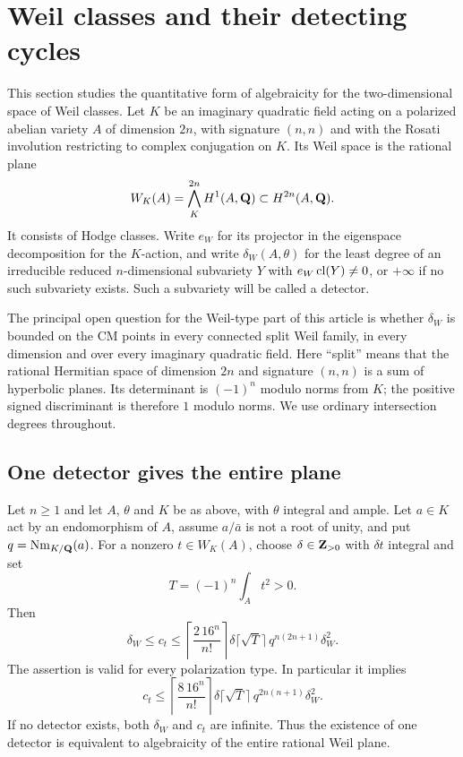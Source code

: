 \section{Weil classes and their detecting cycles}
\label{sec:weil}
This section studies the quantitative form of algebraicity for the two-dimensional space of Weil classes. Let $K$ be an imaginary quadratic field acting on a polarized abelian variety $A$ of dimension $2n$, with signature $(n,n)$ and with the Rosati involution restricting to complex conjugation on $K$. Its Weil space is the rational plane
\[
 W_K(A)=\bigwedge_K^{2n}H^1(A,\mathbf Q)\subset H^{2n}(A,\mathbf Q).
\]
It consists of Hodge classes. Write $e_W$ for its projector in the eigenspace decomposition for the $K$-action, and write $\delta_W(A,\theta)$ for the least degree of an irreducible reduced $n$-dimensional subvariety $Y$ with $e_W\operatorname{cl}(Y)\ne0$, or $+\infty$ if no such subvariety exists. Such a subvariety will be called a detector.

The principal open question for the Weil-type part of this article is whether $\delta_W$ is bounded on the CM points in every connected split Weil family, in every dimension and over every imaginary quadratic field. Here ``split'' means that the rational Hermitian space of dimension $2n$ and signature $(n,n)$ is a sum of hyperbolic planes. Its determinant is $(-1)^n$ modulo norms from $K$; the positive signed discriminant is therefore $1$ modulo norms. We use ordinary intersection degrees throughout.

\subsection{One detector gives the entire plane}

\begin{theorem}\label{thm:extraction}
Let $n\geq1$ and let $A$, $\theta$ and $K$ be as above, with $\theta$ integral and ample. Let $a\in K$ act by an endomorphism of $A$, assume $a/\bar a$ is not a root of unity, and put $q=\operatorname{Nm}_{K/\mathbf Q}(a)$. For a nonzero $t\in W_K(A)$, choose $\delta\in\mathbf Z_{>0}$ with $\delta t$ integral and set
\[
 T=(-1)^n\int_A t^2>0.
\]
Then
\begin{equation}\label{eq:sharper-extraction}
 \delta_W\leq c_t\leq
 \left\lceil\frac{2\,16^n}{n!}\right\rceil
 \delta\lceil\sqrt T\rceil\,
 q^{n(2n+1)}\delta_W^2.
\end{equation}
The assertion is valid for every polarization type. In particular it implies
\begin{equation}\label{eq:original-extraction}
 c_t\leq
 \left\lceil\frac{8\,16^n}{n!}\right\rceil
 \delta\lceil\sqrt T\rceil\,
 q^{2n(n+1)}\delta_W^2.
\end{equation}
If no detector exists, both $\delta_W$ and $c_t$ are infinite. Thus the existence of one detector is equivalent to algebraicity of the entire rational Weil plane.
\end{theorem}

